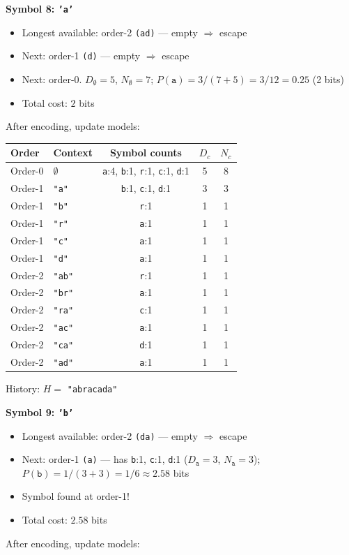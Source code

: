 \begin{examplebox}
\bigskip
\textbf{Symbol 8: \texttt{'a'}}
\begin{itemize}
    \item Longest available: order-2 \texttt{(ad)} — empty $\Rightarrow$ escape
    \item Next: order-1 \texttt{(d)} — empty $\Rightarrow$ escape
    \item Next: order-0. $D_{\emptyset}=5$, $N_{\emptyset}=7$; $P(\texttt{a}) = 3/(7+5) = 3/12 = 0.25$ (2 bits)
    \item Total cost: $2$ bits
\end{itemize}
After encoding, update models:

\begin{center}
\footnotesize
\begin{tabular}{|l|l|c|c|c|}
\hline
\textbf{Order} & \textbf{Context} & \textbf{Symbol counts} & $D_c$ & $N_c$ \\
\hline
Order-0 & $\emptyset$ & \texttt{a}:4, \texttt{b}:1, \texttt{r}:1, \texttt{c}:1, \texttt{d}:1 & 5 & 8 \\
Order-1 & \texttt{"a"} & \texttt{b}:1, \texttt{c}:1, \texttt{d}:1 & 3 & 3 \\
Order-1 & \texttt{"b"} & \texttt{r}:1 & 1 & 1 \\
Order-1 & \texttt{"r"} & \texttt{a}:1 & 1 & 1 \\
Order-1 & \texttt{"c"} & \texttt{a}:1 & 1 & 1 \\
Order-1 & \texttt{"d"} & \texttt{a}:1 & 1 & 1 \\
Order-2 & \texttt{"ab"} & \texttt{r}:1 & 1 & 1 \\
Order-2 & \texttt{"br"} & \texttt{a}:1 & 1 & 1 \\
Order-2 & \texttt{"ra"} & \texttt{c}:1 & 1 & 1 \\
Order-2 & \texttt{"ac"} & \texttt{a}:1 & 1 & 1 \\
Order-2 & \texttt{"ca"} & \texttt{d}:1 & 1 & 1 \\
Order-2 & \texttt{"ad"} & \texttt{a}:1 & 1 & 1 \\
\hline
\end{tabular}
\end{center}
History: $H =$ \texttt{"abracada"}

\bigskip
\textbf{Symbol 9: \texttt{'b'}}
\begin{itemize}
    \item Longest available: order-2 \texttt{(da)} — empty $\Rightarrow$ escape
    \item Next: order-1 \texttt{(a)} — has \texttt{b}:1, \texttt{c}:1, \texttt{d}:1 ($D_{\texttt{a}}=3$, $N_{\texttt{a}}=3$); $P(\texttt{b}) = 1/(3+3) = 1/6 \approx 2.58$ bits
    \item Symbol found at order-1!
    \item Total cost: $2.58$ bits
\end{itemize}
After encoding, update models:


\end{examplebox}
